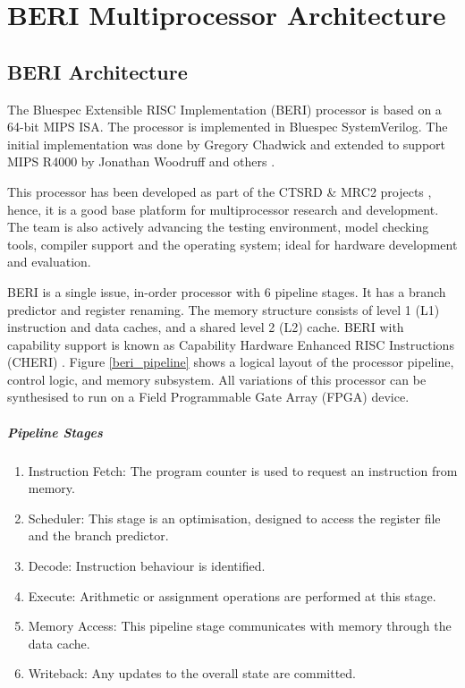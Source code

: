 \makeatletter
\makeatother
\ifpdf
\graphicspath{{Chapter3/Chapter3Figs/PNG/}{Chapter3/Chapter3Figs/PDF/}{Chapter3/Chapter3Figs/}}
\else
\graphicspath{{Chapter3/Chapter3Figs/EPS/}{Chapter3/Chapter3Figs/}}
\fi

\chapter{BERI Multiprocessor Architecture}
	\label{chapter_methadology}

\section{BERI Architecture}
	The Bluespec Extensible RISC Implementation (BERI) processor is based on a 64-bit MIPS ISA. The processor is implemented in Bluespec SystemVerilog. The initial implementation was done by Gregory Chadwick \cite{Chadwick12,Chadwick13} and extended to support MIPS R4000 \cite{MIPS} by Jonathan Woodruff \cite{jon_thesis} and others \cite{BERITech_0,BERITech_1}.
	
	This processor has been developed as part of the CTSRD \& MRC2 projects \cite{CTSRD,MRC2}, hence, it is a good base platform for multiprocessor research and development. The team is also actively advancing the testing environment, model checking tools, compiler support and the operating system; ideal for hardware development and evaluation.
	
	BERI is a single issue, in-order processor with 6 pipeline stages. It has a branch predictor and register renaming. The memory structure consists of level 1 (L1) instruction and data caches, and a shared level 2 (L2) cache. 
	BERI with capability support is known as Capability Hardware Enhanced RISC Instructions (CHERI) \cite{Woodruff14,Watson12,Watson15}. 
	Figure \ref{beri_pipeline} shows a logical layout of the processor pipeline, control logic, and memory subsystem. 
	All variations of this processor can be synthesised to run on a Field Programmable Gate Array (FPGA) device.
	

	
	\paragraph{Pipeline Stages}	
		\begin{enumerate}
			\item Instruction Fetch: The program counter is used to request an instruction from memory.
			\item Scheduler: This stage is an optimisation, designed to access the register file and the branch predictor. 
			\item Decode: Instruction behaviour is identified.
			\item Execute: Arithmetic or assignment operations are performed at this stage.
			\item Memory Access: This pipeline stage communicates with memory through the data cache.
			\item Writeback: Any updates to the overall state are committed.
		\end{enumerate}

